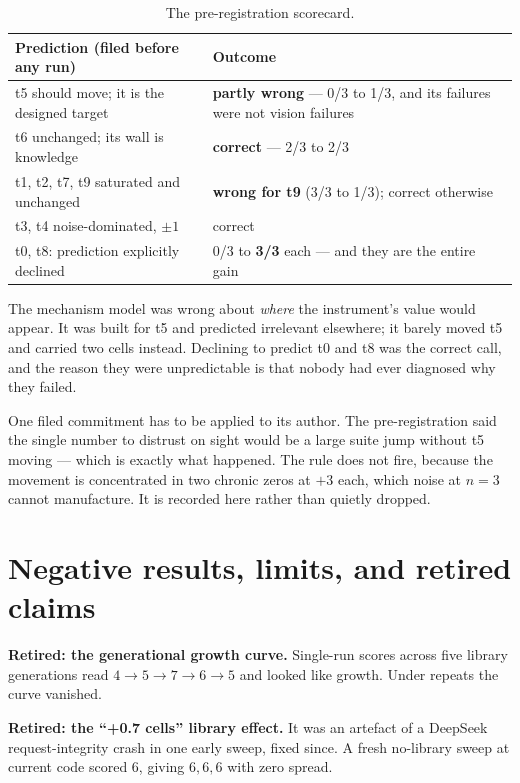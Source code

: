 \documentclass[11pt,a4paper]{article}
\begin{document}
\begin{table}[htbp]
\centering
\small
\begin{tabularx}{\textwidth}{@{}X l@{}}
\toprule
\textbf{Prediction (filed before any run)} & \textbf{Outcome} \\
\midrule
t5 should move; it is the designed target & \textbf{partly wrong} --- 0/3 to 1/3, and its failures were not vision failures \\
t6 unchanged; its wall is knowledge & \textbf{correct} --- 2/3 to 2/3 \\
t1, t2, t7, t9 saturated and unchanged & \textbf{wrong for t9} (3/3 to 1/3); correct otherwise \\
t3, t4 noise-dominated, $\pm 1$ & correct \\
t0, t8: prediction explicitly declined & 0/3 to \textbf{3/3} each --- and they are the entire gain \\
\bottomrule
\end{tabularx}
\caption{The pre-registration scorecard.}
\end{table}

\noindent
The mechanism model was wrong about \emph{where} the instrument's value would
appear. It was built for t5 and predicted irrelevant elsewhere; it barely moved
t5 and carried two cells instead. Declining to predict t0 and t8 was the correct
call, and the reason they were unpredictable is that nobody had ever diagnosed
why they failed.

One filed commitment has to be applied to its author. The pre-registration said
the single number to distrust on sight would be a large suite jump without t5
moving --- which is exactly what happened. The rule does not fire, because the
movement is concentrated in two chronic zeros at $+3$ each, which noise at $n=3$
cannot manufacture. It is recorded here rather than quietly dropped.

\section{Negative results, limits, and retired claims}

\textbf{Retired: the generational growth curve.} Single-run scores across five
library generations read $4 \to 5 \to 7 \to 6 \to 5$ and looked like growth. Under
repeats the curve vanished.

\textbf{Retired: the ``+0.7 cells'' library effect.} It was an artefact of a
DeepSeek request-integrity crash in one early sweep, fixed since. A fresh
no-library sweep at current code scored 6, giving $6,6,6$ with zero spread.
\end{document}
